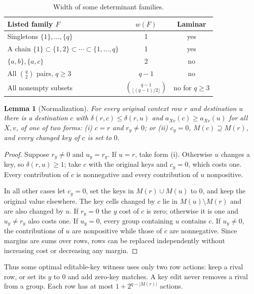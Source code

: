 \documentclass[11pt]{article}
\newtheorem{lemma}{Lemma}
\theoremstyle{remark}
\begin{document}
\begin{table}[H]
\centering
\begin{tabular}{lcc}
\toprule
Listed family $F$ & $w(F)$ & Laminar\\
\midrule
Singletons $\{1\},\ldots,\{q\}$ & 1 & yes\\
A chain $\{1\}\subset\{1,2\}\subset\cdots\subset\{1,\ldots,q\}$ & 1 & yes\\
$\{a,b\},\{a,c\}$ & 2 & no\\
All $\binom{q}{2}$ pairs, $q\ge3$ & $q-1$ & no\\
All nonempty subsets & $\binom{q-1}{\lfloor (q-1)/2\rfloor}$ & no for $q\ge3$\\
\bottomrule
\end{tabular}
\caption{Width of some determinant families.}\label{tab:widths}
\end{table}

\begin{lemma}[Normalization]\label{lem:norm}
For every original context row $r$ and destination $u$ there is a destination
$c$ with $\delta(r,c)\le \delta(r,u)$ and $a_{Xv}(c)\ge a_{Xv}(u)$ for all $X,v$, of
one of two forms: (i) $c=r$ and $r_y\ne0$; or (ii) $c_y=0$,
$M(c)\supseteq M(r)$, and every changed key of $c$ is set to $0$.
\end{lemma}
\begin{proof}
Suppose $r_y\ne0$ and $u_y=r_y$. If $u=r$, take form (i). Otherwise $u$
changes a key, so $\delta(r,u)\ge1$; take $c$ with the original keys and $c_y=0$,
which costs one. Every contribution of $c$ is nonnegative and every
contribution of $u$ nonpositive.

In all other cases let $c_y=0$, set the keys in $M(r)\cup M(u)$ to $0$, and
keep the original value elsewhere. The key cells changed by $c$ lie in
$M(u)\setminus M(r)$ and are also changed by $u$. If $r_y=0$ the $y$ cost of
$c$ is zero; otherwise it is one and $u_y\ne r_y$ also costs one. If $u_y=0$,
every group containing $u$ contains $c$. If $u_y\ne0$, the contributions of
$u$ are nonpositive while those of $c$ are nonnegative. Since margins are sums over rows, rows can be replaced
independently without increasing cost or decreasing any margin.
\end{proof}

Thus some optimal editable-key witness uses only two row actions: keep a rival
row, or set its $y$ to $0$ and add zero-key matches. A key edit never removes a
rival from a group. Each row has at most $1+2^{q-|M(r)|}$ actions.
\end{document}
